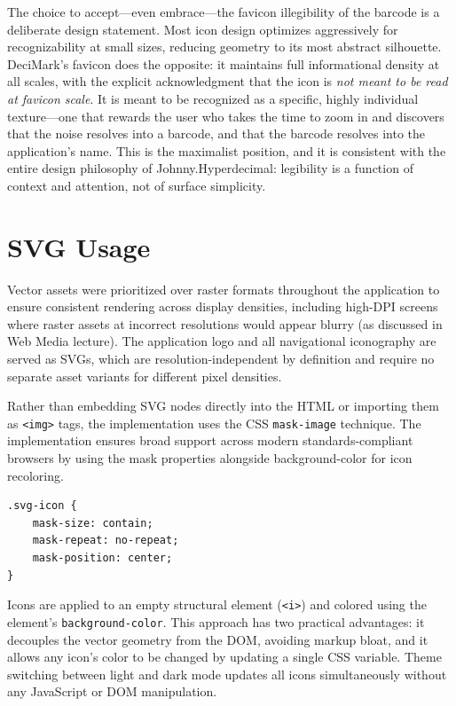 \documentclass[11pt,a4paper]{book}
\begin{document}
The choice to accept---even embrace---the favicon illegibility of the barcode is a deliberate design statement. Most icon design optimizes aggressively for recognizability at small sizes, reducing geometry to its most abstract silhouette. DeciMark's favicon does the opposite: it maintains full informational density at all scales, with the explicit acknowledgment that the icon is {\itshape not meant to be read at favicon scale}. It is meant to be recognized as a specific, highly individual texture---one that rewards the user who takes the time to zoom in and discovers that the noise resolves into a barcode, and that the barcode resolves into the application's name. This is the maximalist position, and it is consistent with the entire design philosophy of Johnny.Hyperdecimal: legibility is a function of context and attention, not of surface simplicity.

\section{SVG Usage}

Vector assets were prioritized over raster formats throughout the application to ensure consistent rendering across display densities, including high-DPI screens where raster assets at incorrect resolutions would appear blurry (as discussed in Web Media lecture). The application logo and all navigational iconography are served as SVGs, which are resolution-independent by definition and require no separate asset variants for different pixel densities.

Rather than embedding SVG nodes directly into the HTML or importing them as \texttt{<img>} tags, the implementation uses the CSS \texttt{mask-image} technique. The implementation ensures broad support across modern standards-compliant browsers by using the mask properties alongside background-color for icon recoloring.

\begin{verbatim}
.svg-icon {
    mask-size: contain;
    mask-repeat: no-repeat;
    mask-position: center;
}
\end{verbatim}

Icons are applied to an empty structural element (\texttt{<i>}) and colored using the element's \texttt{background-color}. This approach has two practical advantages: it decouples the vector geometry from the DOM, avoiding markup bloat, and it allows any icon's color to be changed by updating a single CSS variable. Theme switching between light and dark mode updates all icons simultaneously without any JavaScript or DOM manipulation.
\end{document}
